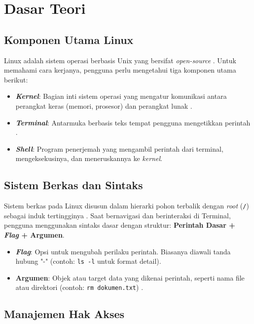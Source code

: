 \newpage
\section{Dasar Teori}

\subsection{Komponen Utama Linux}
Linux adalah sistem operasi berbasis Unix yang bersifat \textit{open-source} \cite{das2012unix}. Untuk memahami cara kerjanya, pengguna perlu mengetahui tiga komponen utama berikut:
\begin{itemize}
	\item \textbf{\textit{Kernel}}: Bagian inti sistem operasi yang mengatur komunikasi antara perangkat keras (memori, prosesor) dan perangkat lunak \cite{Silberschatz2018}.
	\item \textbf{\textit{Terminal}}: Antarmuka berbasis teks tempat pengguna mengetikkan perintah \cite{shotts2019linux}.
	\item \textbf{\textit{Shell}}: Program penerjemah yang mengambil perintah dari terminal, mengeksekusinya, dan meneruskannya ke \textit{kernel}.
\end{itemize}

\subsection{Sistem Berkas dan Sintaks}
Sistem berkas pada Linux disusun dalam hierarki pohon terbalik dengan \textit{root} (\texttt{/}) sebagai induk tertingginya \cite{das2012unix}. Saat bernavigasi dan berinteraksi di Terminal, pengguna menggunakan sintaks dasar dengan struktur: \textbf{Perintah Dasar + \textit{Flag} + Argumen}.

\begin{itemize}
	\item \textbf{\textit{Flag}}: Opsi untuk mengubah perilaku perintah. Biasanya diawali tanda hubung "-" (contoh: \texttt{ls -l} untuk format detail).
	\item \textbf{Argumen}: Objek atau target data yang dikenai perintah, seperti nama file atau direktori (contoh: \texttt{rm dokumen.txt}) \cite{shotts2019linux}.
\end{itemize}

\subsection{Manajemen Hak Akses}

